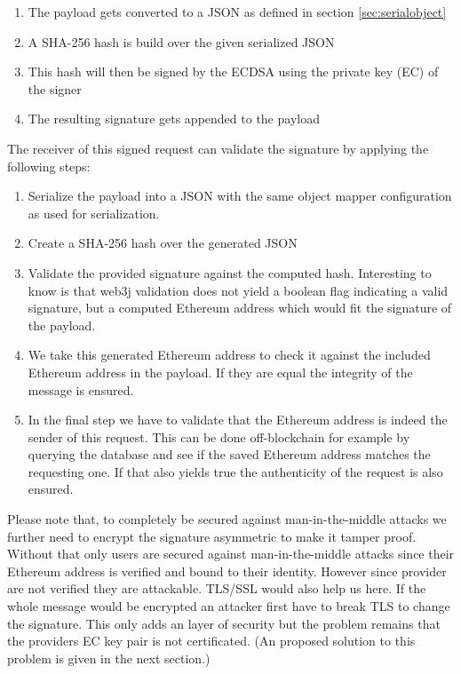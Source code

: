 \begin{enumerate}
\item The payload gets converted to a JSON as defined in section \ref{sec:serialobject}
\item A SHA-256 hash is build over the given serialized JSON
\item This hash will then be signed by the ECDSA using the private key (EC) of the signer
\item The resulting signature gets appended to the payload
\end{enumerate}

\noindent The receiver of this signed request can validate the signature by applying the following steps:

\begin{enumerate}
\item Serialize the payload into a JSON with the same object mapper configuration as used for serialization.
\item Create a SHA-256 hash over the generated JSON
\item Validate the provided signature against the computed hash. Interesting to know is that web3j validation does not yield a boolean flag indicating a valid signature, but a computed Ethereum address which would fit the signature of the payload.
\item We take this generated Ethereum address to check it against the included Ethereum address in the payload. If they are equal the integrity of the message is ensured.
\item In the final step we have to validate that the Ethereum address is indeed the sender of this request. This can be done off-blockchain for example by querying the database and see if the saved Ethereum address matches the requesting one. If that also yields true the authenticity of the request is also ensured.
\end{enumerate}

Please note that, to completely be secured against man-in-the-middle attacks we further need to encrypt the  signature asymmetric to make it tamper proof. Without that only users are secured against man-in-the-middle attacks since their Ethereum address is verified and bound to their identity. However since provider are not verified they are attackable. TLS/SSL would also help us here. If the whole message would be encrypted an attacker first have to break TLS to change the signature. This only adds an layer of security but the problem remains that the providers EC key pair is not certificated.
(An proposed solution to this problem is given in the next section.)

